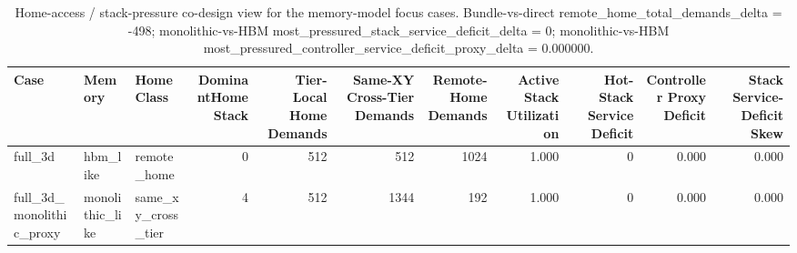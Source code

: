 \begin{table}[t]
  \centering
  \caption{Home-access / stack-pressure co-design view for the memory-model focus cases. Bundle-vs-direct remote\_home\_total\_demands\_delta = -498; monolithic-vs-HBM most\_pressured\_stack\_service\_deficit\_delta = 0; monolithic-vs-HBM most\_pressured\_controller\_service\_deficit\_proxy\_delta = 0.000000.}
  \begin{tabular}{l l l r r r r r r r r}
  \hline
  Case & Memory & HomeClass & DominantHomeStack & Tier-Local Home Demands & Same-XY Cross-Tier Demands & Remote-Home Demands & Active Stack Utilization & Hot-Stack Service Deficit & Controller Proxy Deficit & Stack Service-Deficit Skew \\
  \hline
  full\_3d & hbm\_like & remote\_home & 0 & 512 & 512 & 1024 & 1.000 & 0 & 0.000 & 0.000 \\
  full\_3d\_monolithic\_proxy & monolithic\_like & same\_xy\_cross\_tier & 4 & 512 & 1344 & 192 & 1.000 & 0 & 0.000 & 0.000 \\
  \hline
  \end{tabular}
\end{table}

